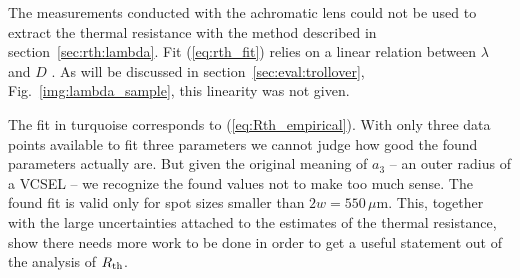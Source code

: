 The measurements conducted
with the achromatic lens
could not be used
to extract the thermal resistance
with the method described
in section~\ref{sec:rth:lambda}.
Fit (\ref{eq:rth_fit}) relies
on a linear relation
between $\lambda$ and $D$
\cite{Heinen2012}.
As will be discussed
in section~\ref{sec:eval:trollover},
Fig.~\ref{img:lambda_sample},
this linearity was not given.

The fit in turquoise
corresponds to (\ref{eq:Rth_empirical}).
With only three data points available
to fit three parameters
we cannot judge
how good the found parameters
actually are.
But given the original meaning
of $a_3$ --
an outer radius  of a VCSEL --
we recognize the found values
not to make too much sense.
The found fit is valid
only for spot sizes smaller
than $2w=550\,\mu\mathrm{m}$.
This,
together with the large uncertainties
attached to the estimates of the thermal resistance,
show there needs more work to be done
in order to get a useful statement
out of the analysis of $R_\mathrm{th}$.


